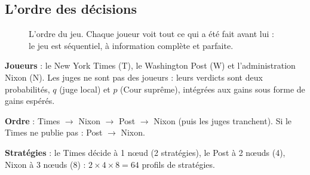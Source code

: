 \documentclass[11pt,a4paper]{article}
\theoremstyle{definition}
\begin{document}
\subsection{L'ordre des décisions}
\begin{figure}[H]
\centering
{}
\caption{L'ordre du jeu. Chaque joueur voit tout ce qui a été fait avant lui : le jeu est séquentiel, à information complète et parfaite.}
\end{figure}

\begin{reponse}
\textbf{Joueurs} : le New York Times (T), le Washington Post (W) et l'administration Nixon (N). Les juges ne sont pas des joueurs : leurs verdicts sont deux probabilités, $q$ (juge local) et $p$ (Cour suprême), intégrées aux gains sous forme de gains espérés.

\textbf{Ordre} : Times $\to$ Nixon $\to$ Post $\to$ Nixon (puis les juges tranchent). Si le Times ne publie pas : Post $\to$ Nixon.

\textbf{Stratégies} : le Times décide à 1 nœud (2 stratégies), le Post à 2 nœuds (4), Nixon à 3 nœuds (8) : $2\times4\times8=64$ profils de stratégies.
\end{reponse}

\end{document}
